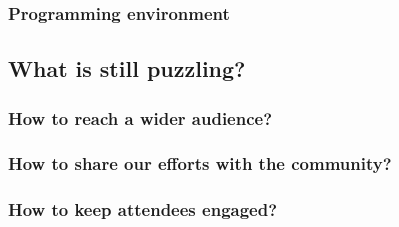 \subsubsection{Programming environment}

\subsection{What is still puzzling?}\label{ssub:puzzles}

\subsubsection{How to reach a wider audience?}

\subsubsection{How to share our efforts with the community?}

\subsubsection{How to keep attendees engaged?}

